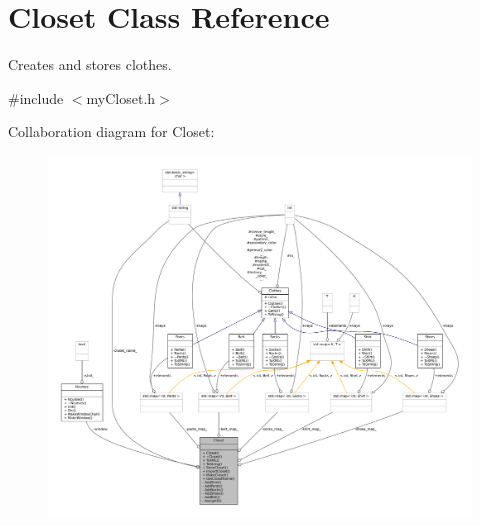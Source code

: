 \hypertarget{classCloset}{}\section{Closet Class Reference}
\label{classCloset}


Creates and stores clothes.  




{\ttfamily \#include $<$my\+Closet.\+h$>$}



Collaboration diagram for Closet\+:\nopagebreak
\begin{figure}[H]
\begin{center}
\leavevmode
\includegraphics[width=350pt]{classCloset__coll__graph}
\end{center}
\end{figure}
